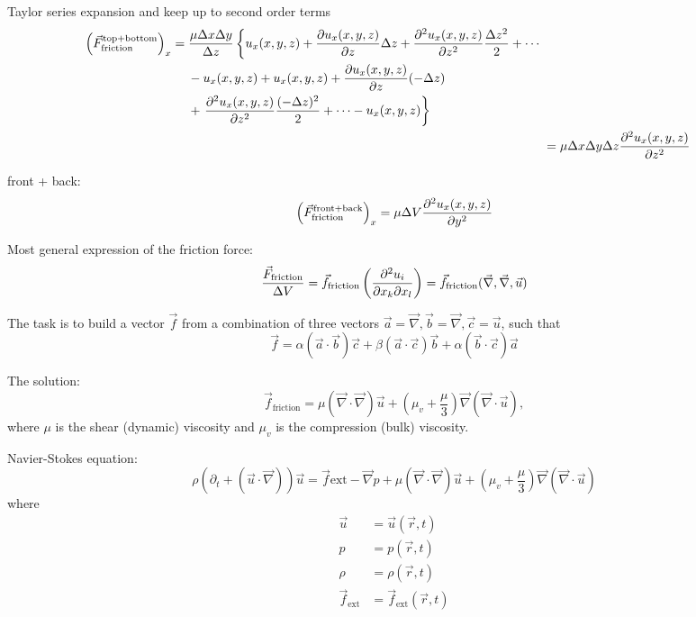 Taylor series expansion and keep up to second order terms
\begin{align}
\begin{split}
\left(\vec{F}_\mathrm{friction}^\mathrm{top+bottom}\right)_x &= \frac{\mu\Delta x  \Delta y}{\Delta z}
\left\{u_x(x,y,z)+\frac{\partial u_x(x,y,z)}{\partial z}\Delta z + \frac{\partial^2 u_x(x,y,z)}{\partial z^2}\frac{\Delta z^2}{2} + \cdots \right.\\
&\hspace{4.5mm} - u_x(x,y,z) + u_x(x,y,z)+\frac{\partial u_x(x,y,z)}{\partial z}(-\Delta z) \\
&\hspace{4.5mm} + \left. \frac{\partial^2 u_x(x,y,z)}{\partial z^2}\frac{(-\Delta z)^2}{2} + \cdots - u_x(x,y,z) \right\}
\end{split}\\
&= \mu \Delta x \Delta y \Delta z \frac{\partial^2 u_x(x,y,z)}{\partial z^2}
\end{align}

front + back:
\begin{equation}
\left(\vec{F}_\mathrm{friction}^\mathrm{front+back}\right)_x = \mu\Delta V \frac{\partial^2 u_x(x,y,z)}{\partial y^2}
\end{equation}

Most general expression of the friction force:
\begin{equation}
\frac{\vec{F}_\mathrm{friction}}{\Delta V} = \vec{f}_\mathrm{friction} \left(\frac{\partial ^2u_i}{\partial x_k\partial x_l}\right) = \vec{f}_\mathrm{friction} (\vec{\nabla},\vec{\nabla},\vec{u})
\end{equation}

The task is to build a vector $\vec{f}$ from a combination of three vectors $\vec{a}=\vec{\nabla}, \vec{b}=\vec{\nabla}, \vec{c}=\vec{u}$, such that
\begin{equation}
\vec{f} = \alpha\left(\vec{a}\cdot\vec{b}\right)\vec{c} + \beta\left(\vec{a}\cdot\vec{c}\right)\vec{b} + \alpha \left(\vec{b}\cdot\vec{c}\right)\vec{a}
\end{equation}

The solution:
\begin{equation}
\vec{f}_\mathrm{friction} = \mu\left(\vec{\nabla}\cdot\vec{\nabla}\right)\vec{u} + \left(\mu_v+\frac{\mu}{3}\right)\vec{\nabla}\left(\vec{\nabla}\cdot\vec{u}\right),
\end{equation}
where $\mu$ is the shear (dynamic) viscosity and $\mu_v$ is the compression (bulk) viscosity.

Navier-Stokes equation:
\begin{equation}
\rho\left(\partial_t+\left(\vec{u}\cdot\vec{\nabla}\right)\right)\vec{u} = \vec{f}\mathrm{ext}-\vec{\nabla}p + \mu\left(\vec{\nabla}\cdot\vec{\nabla}\right)\vec{u} + \left(\mu_v+\frac{\mu}{3}\right)\vec{\nabla}\left(\vec{\nabla}\cdot\vec{u}\right)
\end{equation}
where
\begin{align}
\vec{u} &= \vec{u}\left(\vec{r},t\right)\\
p &= p\left(\vec{r},t\right)\\
\rho &= \rho\left(\vec{r},t\right)\\
\vec{f}_\mathrm{ext} &= \vec{f}_\mathrm{ext}\left(\vec{r},t\right)
\end{align}


